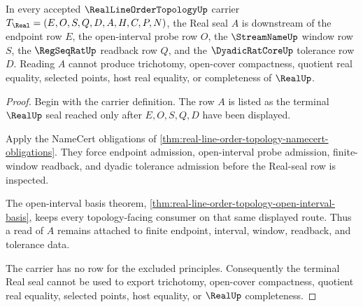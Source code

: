 \begin{theorem}
\label{thm:real-line-order-topology-real-seal-nonescape}
In every accepted $\RealLineOrderTopologyUp$ carrier $T_{\Real}=(E,O,S,Q,D,A,H,C,P,N)$, the Real seal $A$ is downstream of the endpoint row $E$, the open-interval probe row $O$, the $\StreamNameUp$ window row $S$, the $\RegSeqRatUp$ readback row $Q$, and the $\DyadicRatCoreUp$ tolerance row $D$. Reading $A$ cannot produce trichotomy, open-cover compactness, quotient real equality, selected points, host real equality, or completeness of $\RealUp$.
\end{theorem}
\begin{proof}
Begin with the carrier definition. The row $A$ is listed as the terminal $\RealUp$ seal reached only after $E,O,S,Q,D$ have been displayed.

Apply the NameCert obligations of \autoref{thm:real-line-order-topology-namecert-obligations}. They force endpoint admission, open-interval probe admission, finite-window readback, and dyadic tolerance admission before the Real-seal row is inspected.

The open-interval basis theorem, \autoref{thm:real-line-order-topology-open-interval-basis}, keeps every topology-facing consumer on that same displayed route. Thus a read of $A$ remains attached to finite endpoint, interval, window, readback, and tolerance data.

The carrier has no row for the excluded principles. Consequently the terminal Real seal cannot be used to export trichotomy, open-cover compactness, quotient real equality, selected points, host equality, or $\RealUp$ completeness.
\end{proof}




